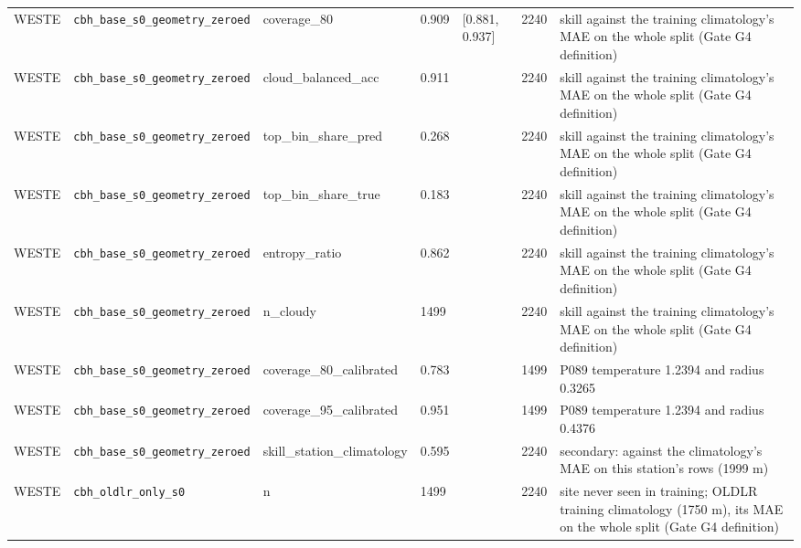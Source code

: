 \begin{center}
{\begin{tabular}{lp{2.4cm}llllp{7.3cm}}
WESTE & \texttt{cbh\_\allowbreak{}base\_\allowbreak{}s0\_\allowbreak{}geometry\_\allowbreak{}zeroed} & coverage\_80 & 0.909 & [0.881, 0.937] & 2240 & skill against the training climatology's MAE on the whole split (Gate G4 definition) \\
WESTE & \texttt{cbh\_\allowbreak{}base\_\allowbreak{}s0\_\allowbreak{}geometry\_\allowbreak{}zeroed} & cloud\_balanced\_acc & 0.911 &  & 2240 & skill against the training climatology's MAE on the whole split (Gate G4 definition) \\
WESTE & \texttt{cbh\_\allowbreak{}base\_\allowbreak{}s0\_\allowbreak{}geometry\_\allowbreak{}zeroed} & top\_bin\_share\_pred & 0.268 &  & 2240 & skill against the training climatology's MAE on the whole split (Gate G4 definition) \\
WESTE & \texttt{cbh\_\allowbreak{}base\_\allowbreak{}s0\_\allowbreak{}geometry\_\allowbreak{}zeroed} & top\_bin\_share\_true & 0.183 &  & 2240 & skill against the training climatology's MAE on the whole split (Gate G4 definition) \\
WESTE & \texttt{cbh\_\allowbreak{}base\_\allowbreak{}s0\_\allowbreak{}geometry\_\allowbreak{}zeroed} & entropy\_ratio & 0.862 &  & 2240 & skill against the training climatology's MAE on the whole split (Gate G4 definition) \\
WESTE & \texttt{cbh\_\allowbreak{}base\_\allowbreak{}s0\_\allowbreak{}geometry\_\allowbreak{}zeroed} & n\_cloudy & 1499 &  & 2240 & skill against the training climatology's MAE on the whole split (Gate G4 definition) \\
WESTE & \texttt{cbh\_\allowbreak{}base\_\allowbreak{}s0\_\allowbreak{}geometry\_\allowbreak{}zeroed} & coverage\_80\_calibrated & 0.783 &  & 1499 & P089 temperature 1.2394 and radius 0.3265 \\
WESTE & \texttt{cbh\_\allowbreak{}base\_\allowbreak{}s0\_\allowbreak{}geometry\_\allowbreak{}zeroed} & coverage\_95\_calibrated & 0.951 &  & 1499 & P089 temperature 1.2394 and radius 0.4376 \\
WESTE & \texttt{cbh\_\allowbreak{}base\_\allowbreak{}s0\_\allowbreak{}geometry\_\allowbreak{}zeroed} & skill\_station\_climatology & 0.595 &  & 2240 & secondary: against the climatology's MAE on this station's rows (1999 m) \\
WESTE & \texttt{cbh\_\allowbreak{}oldlr\_\allowbreak{}only\_\allowbreak{}s0} & n & 1499 &  & 2240 & site never seen in training; OLDLR training climatology (1750 m), its MAE on the whole split (Gate G4 definition) \\

\end{tabular}}
\end{center}
